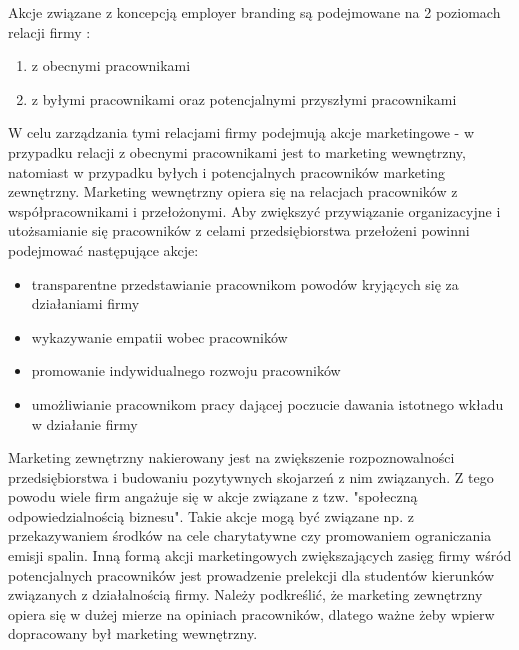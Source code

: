 Akcje związane z koncepcją employer branding są podejmowane na 2 poziomach relacji firmy \cite{spychala-2019}:
\begin{enumerate}
    \item z obecnymi pracownikami
    \item z byłymi pracownikami oraz potencjalnymi przyszłymi pracownikami
\end{enumerate}

W celu zarządzania tymi relacjami firmy podejmują akcje marketingowe - w przypadku relacji z obecnymi pracownikami jest to marketing wewnętrzny,
natomiast w przypadku byłych i potencjalnych pracowników marketing zewnętrzny.
Marketing wewnętrzny opiera się na relacjach pracowników z współpracownikami i przełożonymi.
Aby zwiększyć przywiązanie organizacyjne i utożsamianie się pracowników z celami przedsiębiorstwa przełożeni powinni podejmować następujące akcje:
\begin{itemize}
    \item transparentne przedstawianie pracownikom powodów kryjących się za działaniami firmy
    \item wykazywanie empatii wobec pracowników
    \item promowanie indywidualnego rozwoju pracowników
    \item umożliwianie pracownikom pracy dającej poczucie dawania istotnego wkładu w działanie firmy
\end{itemize}

Marketing zewnętrzny nakierowany jest na zwiększenie rozpoznowalności przedsiębiorstwa i budowaniu pozytywnych skojarzeń z nim związanych.
Z tego powodu wiele firm angażuje się w akcje związane z tzw. "społeczną odpowiedzialnością biznesu".
Takie akcje mogą być związane np. z przekazywaniem środków na cele charytatywne czy promowaniem ograniczania emisji spalin.
Inną formą akcji marketingowych zwiększających zasięg firmy wśród potencjalnych pracowników jest prowadzenie prelekcji dla studentów kierunków związanych z działalnością firmy.
Należy podkreślić, że marketing zewnętrzny opiera się w dużej mierze na opiniach pracowników, dlatego ważne żeby wpierw dopracowany był marketing wewnętrzny.

